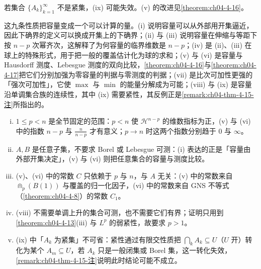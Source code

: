 \documentclass[../../main.tex]{subfiles}%
\begin{document}
\begin{remark}\label{remark:ch04-thm-4-15-注}
若集合 $\{A_k\}_{k=1}^{\infty}$ 不是紧集，(ix) 可能失效。(v) 的改进见\cref{theorem:ch04-4-16}。%
\end{remark}

\begin{remark}\label{remark:ch04-thm-4-15-动机}
这九条性质把容量变成一个可以计算的量。(i) 说明容量可以从外部用开集逼近，因此下确界的定义可以换成开集上的下确界；(ii) 与 (iii) 说明容量在伸缩与等距下按 $n-p$ 次幂齐次，这解释了为何容量的临界维数是 $n-p$；(iv) 是 (ii)、(iii) 在球上的特殊形式，用于把一般的覆盖估计化为球的求和；(v) 与 (vi) 是容量与 Hausdorff 测度、Lebesgue 测度的双向比较，\cref{theorem:ch04-4-16}与\cref{theorem:ch04-4-17}把它们分别加强为零容量的判据与零测度的判据；(vii) 是比次可加性更强的「强次可加性」，它使 $\max$ 与 $\min$ 的能量分解成为可能；(viii) 与 (ix) 是容量沿单调集合族的连续性，其中 (ix) 需要紧性，其反例正是\cref{remark:ch04-thm-4-15-注}所指出的。%
\end{remark}

\begin{remark}\label{remark:ch04-thm-4-15-条件}
\begin{enumerate}[(i)]
\item $1\leqslant p<n$ 是全节固定的范围：$p<n$ 使 $\mathcal{H}^{n-p}$ 的维数指标为正，(v) 与 (vi) 中的指数 $n-p$ 与 $\frac{n}{n-p}$ 才有意义；$p\to n$ 时这两个指数分别趋于 $0$ 与 $\infty$。
\item $A,B$ 是任意子集，不要求 Borel 或 Lebesgue 可测：(i) 表达的正是「容量由外部开集决定」，(v) 与 (vi) 则把任意集合的容量与测度比较。
\item (v)、(vi) 中的常数 $C$ 只依赖于 $p$ 与 $n$，与 $A$ 无关：(v) 中的常数来自 $\Cap_p(B(1))$ 与覆盖的归一化因子，(vi) 中的常数来自 GNS 不等式（\cref{theorem:ch04-4-8}）的常数 $C_1$。%
\item (viii) 不需要单调上升的集合可测，也不需要它们有界；证明只用到\cref{theorem:ch04-4-13}(iii) 与 $L^p$ 的弱紧性，故要求 $p>1$。%
\item (ix) 中「$A_k$ 为紧集」不可省：紧性通过有限交性质把 $\bigcap_kA_k\subseteq U$（$U$ 开）转化为某个 $A_m\subseteq U$，若 $A_k$ 只是一般闭集或 Borel 集，这一转化失效，\cref{remark:ch04-thm-4-15-注}说明此时结论可能不成立。%
\end{enumerate}
\end{remark}
\end{document}
